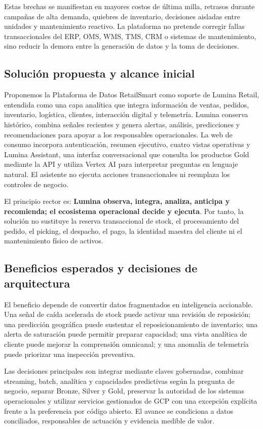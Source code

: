 \documentclass[11pt,a4paper]{article}
\begin{document}
Estas brechas se manifiestan en mayores costos de última milla, retrasos durante campañas de alta demanda, quiebres de inventario, decisiones aisladas entre unidades y mantenimiento reactivo. La plataforma no pretende corregir fallas transaccionales del ERP, OMS, WMS, TMS, CRM o sistemas de mantenimiento, sino reducir la demora entre la generación de datos y la toma de decisiones.

\subsection{Solución propuesta y alcance inicial}
Proponemos la Plataforma de Datos RetailSmart como soporte de Lumina Retail, entendida como una capa analítica que integra información de ventas, pedidos, inventario, logística, clientes, interacción digital y telemetría. Lumina conserva histórico, combina señales recientes y genera alertas, análisis, predicciones y recomendaciones para apoyar a los responsables operacionales. La web de consumo incorpora autenticación, resumen ejecutivo, cuatro vistas operativas y Lumina Assistant, una interfaz conversacional que consulta los productos Gold mediante la API y utiliza Vertex AI para interpretar preguntas en lenguaje natural. El asistente no ejecuta acciones transaccionales ni reemplaza los controles de negocio.

El principio rector es: \textbf{Lumina observa, integra, analiza, anticipa y recomienda; el ecosistema operacional decide y ejecuta}. Por tanto, la solución no sustituye la reserva transaccional de stock, el procesamiento del pedido, el picking, el despacho, el pago, la identidad maestra del cliente ni el mantenimiento físico de activos.

\subsection{Beneficios esperados y decisiones de arquitectura}
El beneficio depende de convertir datos fragmentados en inteligencia accionable. Una señal de caída acelerada de stock puede activar una revisión de reposición; una predicción geográfica puede sustentar el reposicionamiento de inventario; una alerta de saturación puede permitir preparar capacidad; una vista analítica de cliente puede mejorar la comprensión omnicanal; y una anomalía de telemetría puede priorizar una inspección preventiva.

Las decisiones principales son integrar mediante claves gobernadas, combinar streaming, batch, analítica y capacidades predictivas según la pregunta de negocio, separar Bronze, Silver y Gold, preservar la autoridad de los sistemas operacionales y utilizar servicios gestionados de GCP con una excepción explícita frente a la preferencia por código abierto. El avance se condiciona a datos conciliados, responsables de actuación y evidencia medible de valor.
\end{document}
